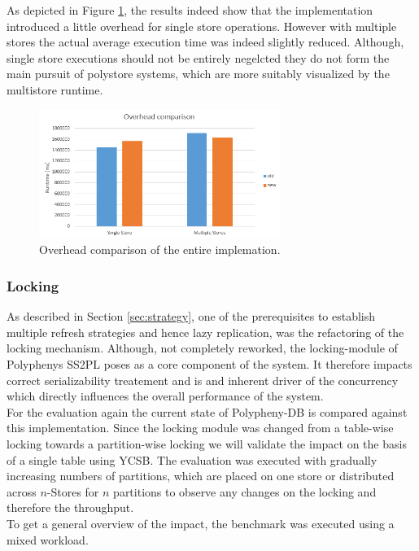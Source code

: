 As depicted in Figure \ref{fig:overhead}, the results indeed show that the implementation introduced a little overhead for single store operations.
However with multiple stores the actual average execution time was indeed slightly reduced. Although, single store executions should not be entirely negelcted
they do not form the main pursuit of polystore systems, which are more suitably visualized by the multistore runtime.


\begin{figure}[t] 
    \centering 
    \includegraphics[width=0.7\textwidth]{Figures/overhead.png}
    \caption{Overhead comparison of the entire implemation.}
    \label{fig:overhead}
\end{figure}


\subsubsection{Locking } 

As described in Section \ref{sec:strategy}, one of the prerequisites to establish multiple refresh strategies and hence lazy replication,  
was the refactoring of the locking mechanism. Although, not completely reworked, the locking-module of Polyphenys SS2PL 
poses as a core component of the system. It therefore  impacts correct serializability treatement and is and inherent driver of 
the concurrency which directly influences the overall performance of the system.\\
For the evaluation again the current state of Polypheny-DB is compared against this implementation.
Since the locking module was changed from a table-wise locking towards a partition-wise locking we will validate the impact on the basis of 
a single table using YCSB. 
The evaluation was executed with gradually increasing numbers of partitions, which are placed on one store or distributed across $n$-Stores 
for $n$ partitions to observe any changes on the locking and therefore the throughput.\\
To get a general overview of the impact, the benchmark was executed using a mixed workload.\\

